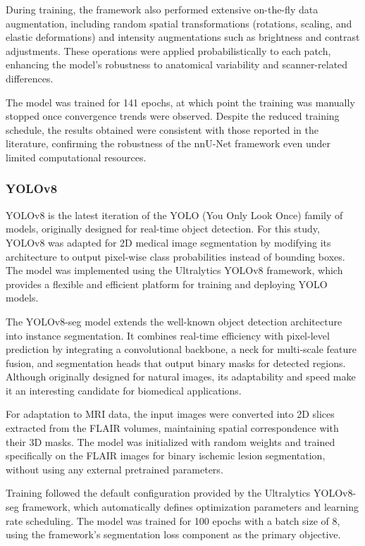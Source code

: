 \documentclass[12pt]{article}
\begin{document}
During training, the framework also performed extensive on-the-fly data augmentation, including random spatial transformations (rotations, scaling, and elastic deformations) and intensity augmentations such as brightness and contrast adjustments. These operations were applied probabilistically to each patch, enhancing the model’s robustness to anatomical variability and scanner-related differences.

The model was trained for 141 epochs, at which point the training was manually stopped once convergence trends were observed. Despite the reduced training schedule, the results obtained were consistent with those reported in the literature, confirming the robustness of the nnU-Net framework even under limited computational resources.

\subsubsection{YOLOv8} \label{subsec:yolov8}

YOLOv8 is the latest iteration of the YOLO (You Only Look Once) family of models, originally designed for real-time object detection. For this study, YOLOv8 was adapted for 2D medical image segmentation by modifying its architecture to output pixel-wise class probabilities instead of bounding boxes. The model was implemented using the Ultralytics YOLOv8 framework, which provides a flexible and efficient platform for training and deploying YOLO models.

The YOLOv8-seg model extends the well-known object detection architecture into instance segmentation. It combines real-time efficiency with pixel-level prediction by integrating a convolutional backbone, a neck for multi-scale feature fusion, and segmentation heads that output binary masks for detected regions. Although originally designed for natural images, its adaptability and speed make it an interesting candidate for biomedical applications. 

For adaptation to MRI data, the input images were converted into 2D slices extracted from the FLAIR volumes, maintaining spatial correspondence with their 3D masks. The model was initialized with random weights and trained specifically on the FLAIR images for binary ischemic lesion segmentation, without using any external pretrained parameters.

Training followed the default configuration provided by the Ultralytics YOLOv8-seg framework, which automatically defines optimization parameters and learning rate scheduling. The model was trained for 100 epochs with a batch size of 8, using the framework’s segmentation loss component as the primary objective.
\end{document}
